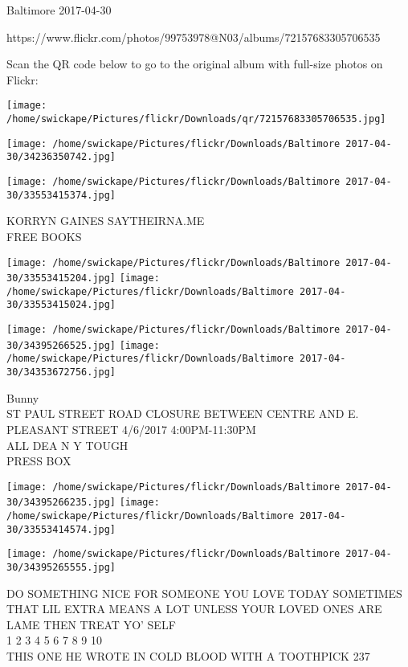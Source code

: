 \documentclass[10pt,letterpaper]{article}
\begin{document}
Baltimore 2017-04-30

https://www.flickr.com/photos/99753978@N03/albums/72157683305706535

Scan the QR code below to go to the original album with full-size photos on Flickr:

\texttt{[image: /home/swickape/Pictures/flickr/Downloads/qr/72157683305706535.jpg]}
\pagebreak

\texttt{[image: /home/swickape/Pictures/flickr/Downloads/Baltimore 2017-04-30/34236350742.jpg]}

\vspace{0.25in}
\texttt{[image: /home/swickape/Pictures/flickr/Downloads/Baltimore 2017-04-30/33553415374.jpg]}

KORRYN GAINES SAYTHEIRNA.ME\\
FREE BOOKS\\
\pagebreak

\texttt{[image: /home/swickape/Pictures/flickr/Downloads/Baltimore 2017-04-30/33553415204.jpg]}
\texttt{[image: /home/swickape/Pictures/flickr/Downloads/Baltimore 2017-04-30/33553415024.jpg]}

\texttt{[image: /home/swickape/Pictures/flickr/Downloads/Baltimore 2017-04-30/34395266525.jpg]}
\texttt{[image: /home/swickape/Pictures/flickr/Downloads/Baltimore 2017-04-30/34353672756.jpg]}

Bunny\\
ST PAUL STREET ROAD CLOSURE BETWEEN CENTRE AND E. PLEASANT STREET 4/6/2017 4:00PM{-}11:30PM\\
ALL DEA N Y TOUGH\\
PRESS BOX\\
\pagebreak

\texttt{[image: /home/swickape/Pictures/flickr/Downloads/Baltimore 2017-04-30/34395266235.jpg]}
\texttt{[image: /home/swickape/Pictures/flickr/Downloads/Baltimore 2017-04-30/33553414574.jpg]}

\texttt{[image: /home/swickape/Pictures/flickr/Downloads/Baltimore 2017-04-30/34395265555.jpg]}

DO SOMETHING NICE FOR SOMEONE YOU LOVE TODAY SOMETIMES THAT LIL EXTRA MEANS A LOT UNLESS YOUR LOVED ONES ARE LAME THEN TREAT YO' SELF\\
1 2 3 4 5 6 7 8 9 10\\
THIS ONE HE WROTE IN COLD BLOOD WITH A TOOTHPICK 237\\
\pagebreak
\end{document}
